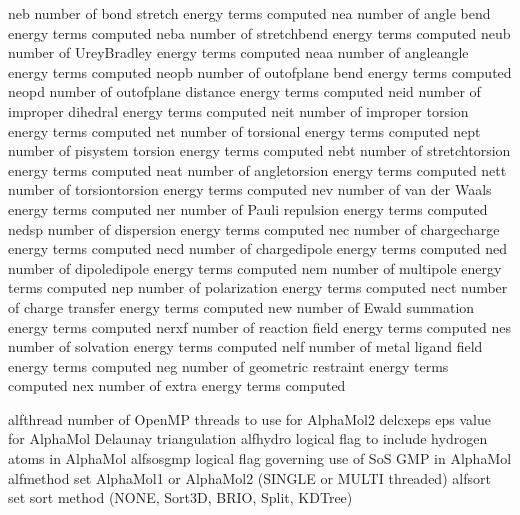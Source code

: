 \documentclass[letterpaper,11pt,english]{sphinxmanual}
\begin{document}
\sphinxAtStartPar
{}

\begin{sphinxVerbatim}[commandchars=\\\{\}]
neb             number of bond stretch energy terms computed
nea             number of angle bend energy terms computed
neba            number of stretch\PYGZhy{}bend energy terms computed
neub            number of Urey\PYGZhy{}Bradley energy terms computed
neaa            number of angle\PYGZhy{}angle energy terms computed
neopb           number of out\PYGZhy{}of\PYGZhy{}plane bend energy terms computed
neopd           number of out\PYGZhy{}of\PYGZhy{}plane distance energy terms computed
neid            number of improper dihedral energy terms computed
neit            number of improper torsion energy terms computed
net             number of torsional energy terms computed
nept            number of pi\PYGZhy{}system torsion energy terms computed
nebt            number of stretch\PYGZhy{}torsion energy terms computed
neat            number of angle\PYGZhy{}torsion energy terms computed
nett            number of torsion\PYGZhy{}torsion energy terms computed
nev             number of van der Waals energy terms computed
ner             number of Pauli repulsion energy terms computed
nedsp           number of dispersion energy terms computed
nec             number of charge\PYGZhy{}charge energy terms computed
necd            number of charge\PYGZhy{}dipole energy terms computed
ned             number of dipole\PYGZhy{}dipole energy terms computed
nem             number of multipole energy terms computed
nep             number of polarization energy terms computed
nect            number of charge transfer energy terms computed
new             number of Ewald summation energy terms computed
nerxf           number of reaction field energy terms computed
nes             number of solvation energy terms computed
nelf            number of metal ligand field energy terms computed
neg             number of geometric restraint energy terms computed
nex             number of extra energy terms computed
\end{sphinxVerbatim}

\sphinxAtStartPar
{}

\begin{sphinxVerbatim}[commandchars=\\\{\}]
alfthread       number of OpenMP threads to use for AlphaMol2
delcxeps        eps value for AlphaMol Delaunay triangulation
alfhydro        logical flag to include hydrogen atoms in AlphaMol
alfsosgmp       logical flag governing use of SoS GMP in AlphaMol
alfmethod       set AlphaMol1 or AlphaMol2 (SINGLE or MULTI threaded)
alfsort         set sort method (NONE, Sort3D, BRIO, Split, KDTree)
\end{sphinxVerbatim}
\end{document}
